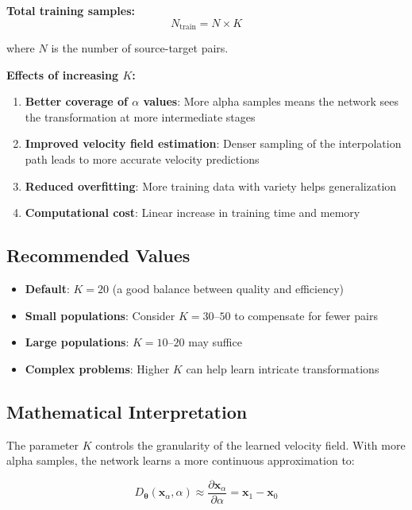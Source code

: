 \documentclass[11pt,a4paper]{article}
\newcommand{\vx}{\mathbf{x}}
\newcommand{\vtheta}{\boldsymbol{\theta}}
\begin{document}
\textbf{Total training samples:}
\begin{equation}
    N_{\text{train}} = N \times K
\end{equation}

where $N$ is the number of source-target pairs.

\textbf{Effects of increasing $K$:}
\begin{enumerate}
    \item \textbf{Better coverage of $\alpha$ values}: More alpha samples means the network sees the transformation at more intermediate stages
    \item \textbf{Improved velocity field estimation}: Denser sampling of the interpolation path leads to more accurate velocity predictions
    \item \textbf{Reduced overfitting}: More training data with variety helps generalization
    \item \textbf{Computational cost}: Linear increase in training time and memory
\end{enumerate}

\subsection{Recommended Values}

\begin{itemize}
    \item \textbf{Default}: $K = 20$ (a good balance between quality and efficiency)
    \item \textbf{Small populations}: Consider $K = 30$--$50$ to compensate for fewer pairs
    \item \textbf{Large populations}: $K = 10$--$20$ may suffice
    \item \textbf{Complex problems}: Higher $K$ can help learn intricate transformations
\end{itemize}

\subsection{Mathematical Interpretation}

The parameter $K$ controls the granularity of the learned velocity field. With more alpha samples, the network learns a more continuous approximation to:

\begin{equation}
    D_\vtheta(\vx_\alpha, \alpha) \approx \frac{\partial \vx_\alpha}{\partial \alpha} = \vx_1 - \vx_0
\end{equation}
\end{document}
